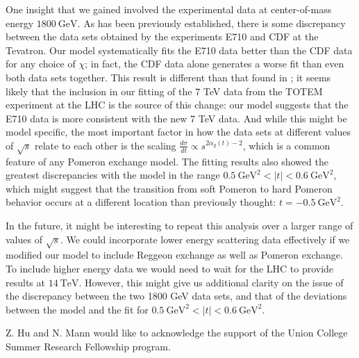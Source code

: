 \documentclass[aps, prd, preprintnumbers, floatfix, showpacs, showkeys, nofootinbib, 10pt]{revtex4-1}
\begin{document}
One insight that we gained involved the experimental data at center-of-mass energy $1800 \ \mathrm{GeV}$.  As has been previously established, there is some discrepancy between the data sets obtained by the experiments E710 and CDF at the Tevatron.  Our model systematically fits the E710 data better than the CDF data for any choice of $\chi$; in fact, the CDF data alone generates a worse fit than even both data sets together.  This result is different than that found in \cite{DHM}; it seems likely that the inclusion in our fitting of the 7 TeV data from the TOTEM experiment at the LHC is the source of this change: our model suggests that the E710 data is more consistent with the new 7 TeV data.  And while this might be model specific, the most important factor in how the data sets at different values of $\sqrt{s}$ relate to each other is the scaling $\frac{d\sigma}{dt} \propto s^{2\alpha_g(t) - 2}$, which is a common feature of any Pomeron exchange model.  The fitting results also showed the greatest discrepancies with the model in the range $0.5 \ \mathrm{GeV}^2 < |t| < 0.6 \ \mathrm{GeV}^2$, which might suggest that the transition from soft Pomeron to hard Pomeron behavior occurs at a different location than previously thought: $t = -0.5 \ \mathrm{GeV}^2$.  

In the future, it might be interesting to repeat this analysis over a larger range of values of $\sqrt{s}$.  We could incorporate lower energy scattering data effectively if we modified our model to include Reggeon exchange as well as Pomeron exchange.  To include higher energy data we would need to wait for the LHC to provide results at $14 \ \mathrm{TeV}$.  However, this might give us additional clarity on the issue of the discrepancy between the two 1800 GeV data sets, and that of the deviations between the model and the fit for $0.5 \ \mathrm{GeV}^2 < |t| < 0.6 \ \mathrm{GeV}^2$.

\begin{acknowledgements}
Z. Hu and N. Mann would like to acknowledge the support of the Union College Summer Research Fellowship program.
\end{acknowledgements}
\end{document}
